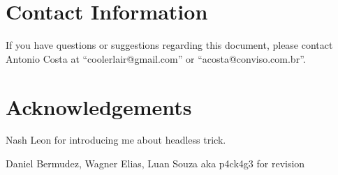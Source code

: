 \documentclass[tog]{acmsiggraph}
\begin{document}
\section{Contact Information}

If you have questions or suggestions regarding this document, please
contact Antonio Costa at ``coolerlair@gmail.com'' or ``acosta@conviso.com.br''.

\section*{Acknowledgements}

Nash Leon for introducing me about headless trick.

Daniel Bermudez, Wagner Elias, Luan Souza aka p4ck4g3 for revision‏


\nocite{*}

\end{document}

